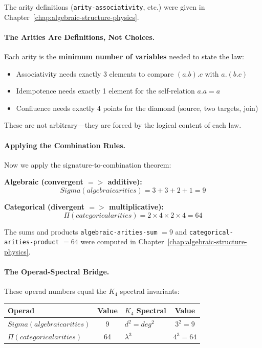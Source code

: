 \documentclass[11pt,a4paper]{book}
\def\Sigma{Sigma}%
\def\Rightarrow{=>}%
\def\cdot{.}%
\def\text#1{#1}%
\begin{document}
The arity definitions (\verb|arity-associativity|, etc.) were given in 
Chapter~\ref{chap:algebraic-structure-physics}.

\paragraph{The Arities Are Definitions, Not Choices.}

Each arity is the \textbf{minimum number of variables} needed to state the law:

\begin{itemize}
\item Associativity needs exactly 3 elements to compare $(a \cdot b) \cdot c$ with $a \cdot (b \cdot c)$
\item Idempotence needs exactly 1 element for the self-relation $a \cdot a = a$
\item Confluence needs exactly 4 points for the diamond (source, two targets, join)
\end{itemize}

These are not arbitrary---they are forced by the logical content of each law.

\paragraph{Applying the Combination Rules.}

Now we apply the signature-to-combination theorem:

\textbf{Algebraic (convergent $\Rightarrow$ additive):}
$$\Sigma(\text{algebraic arities}) = 3 + 3 + 2 + 1 = 9$$

\textbf{Categorical (divergent $\Rightarrow$ multiplicative):}
$$\Pi(\text{categorical arities}) = 2 \times 4 \times 2 \times 4 = 64$$

The sums and products \verb|algebraic-arities-sum| $= 9$ and 
\verb|categorical-arities-product| $= 64$ were computed in 
Chapter~\ref{chap:algebraic-structure-physics}.

\paragraph{The Operad-Spectral Bridge.}

These operad numbers equal the $K_4$ spectral invariants:

\begin{center}
\begin{tabular}{lclc}
\textbf{Operad} & \textbf{Value} & \textbf{$K_4$ Spectral} & \textbf{Value} \\
\hline
$\Sigma(\text{algebraic arities})$ & 9 & $d^2 = \text{deg}^2$ & $3^2 = 9$ \\
$\Pi(\text{categorical arities})$ & 64 & $\lambda^3$ & $4^3 = 64$ \\
\end{tabular}
\end{center}
\end{document}
